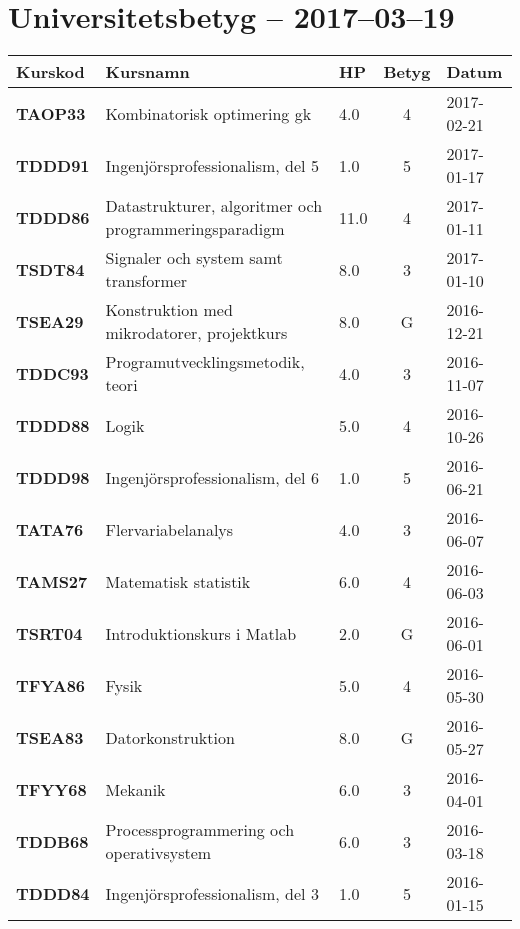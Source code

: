 \documentclass[a4paper,notitlepage]{article}
\begin{document}
\section*{Universitetsbetyg -- 2017--03--19}
\renewcommand*{\arraystretch}{1.4}
\begin{longtable}[h]{l l l c l}
    \textbf{Kurskod} & \textbf{Kursnamn} & \textbf{HP} & \textbf{Betyg} & \textbf{Datum}
    \\ \hline
    \textbf{TAOP33} & Kombinatorisk optimering gk	                       & 4.0&4	&2017-02-21 \\
    \textbf{TDDD91} & Ingenjörsprofessionalism, del 5	                   & 1.0&5	&2017-01-17 \\
    \textbf{TDDD86} & Datastrukturer, algoritmer och programmeringsparadigm & 11.0&4	&2017-01-11 \\
    \textbf{TSDT84} & Signaler och system samt transformer	               & 8.0&3	&2017-01-10 \\
    \textbf{TSEA29} & Konstruktion med mikrodatorer, projektkurs	           & 8.0&G	&2016-12-21 \\
    \textbf{TDDC93} & Programutvecklingsmetodik, teori	                   & 4.0&3	&2016-11-07 \\
    \textbf{TDDD88} & Logik	                                               & 5.0&4	&2016-10-26 \\
    \textbf{TDDD98} & Ingenjörsprofessionalism, del 6	                   & 1.0&5	&2016-06-21 \\
    \textbf{TATA76} & Flervariabelanalys	                                   & 4.0&3	&2016-06-07 \\
    \textbf{TAMS27} & Matematisk statistik	                               & 6.0&4	&2016-06-03 \\
    \textbf{TSRT04} & Introduktionskurs i Matlab	                           & 2.0&G	&2016-06-01 \\
    \textbf{TFYA86} & Fysik	                                               & 5.0&4	&2016-05-30 \\
    \textbf{TSEA83} & Datorkonstruktion	                                   & 8.0&G	&2016-05-27 \\
    \textbf{TFYY68} & Mekanik	                                           & 6.0&3	&2016-04-01 \\
    \textbf{TDDB68} & Processprogrammering och operativsystem	           & 6.0&3	&2016-03-18 \\
    \textbf{TDDD84} & Ingenjörsprofessionalism, del 3	                   & 1.0&5	&2016-01-15 \\

\end{longtable}
\end{document}
